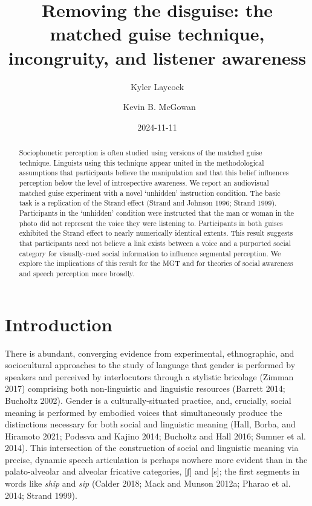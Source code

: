 \documentclass[
  letterpaper,
  DIV=11,
  numbers=noendperiod]{scrartcl}
\title{Removing the disguise: the matched guise technique, incongruity,
and listener awareness}
\author{Kyler Laycock \and ~Kevin B. McGowan}
\date{2024-11-11}
\begin{document}
\maketitle
\begin{abstract}
Sociophonetic perception is often studied using versions of the matched
guise technique. Linguists using this technique appear united in the
methodological assumptions that participants believe the manipulation
and that this belief influences perception below the level of
introspective awareness. We report an audiovisual matched guise
experiment with a novel `unhidden' instruction condition. The basic task
is a replication of the Strand effect (Strand and Johnson 1996; Strand
1999). Participants in the `unhidden' condition were instructed that the
man or woman in the photo did not represent the voice they were
listening to. Participants in both guises exhibited the Strand effect to
nearly numerically identical extents. This result suggests that
participants need not believe a link exists between a voice and a
purported social category for visually-cued social information to
influence segmental perception. We explore the implications of this
result for the MGT and for theories of social awareness and speech
perception more broadly.
\end{abstract}


\section{Introduction}\label{sec-intro}

There is abundant, converging evidence from experimental, ethnographic,
and sociocultural approaches to the study of language that gender is
performed by speakers and perceived by interlocutors through a stylistic
bricolage (Zimman 2017) comprising both non-linguistic and linguistic
resources (Barrett 2014; Bucholtz 2002). Gender is a culturally-situated
practice, and, crucially, social meaning is performed by embodied voices
that simultaneously produce the distinctions necessary for both social
and linguistic meaning (Hall, Borba, and Hiramoto 2021; Podesva and
Kajino 2014; Bucholtz and Hall 2016; Sumner et al. 2014). This
intersection of the construction of social and linguistic meaning via
precise, dynamic speech articulation is perhaps nowhere more evident
than in the palato-alveolar and alveolar fricative categories, {[}ʃ{]}
and {[}s{]}; the first segments in words like \emph{ship} and \emph{sip}
(Calder 2018; Mack and Munson 2012a; Pharao et al. 2014; Strand 1999).
\end{document}
